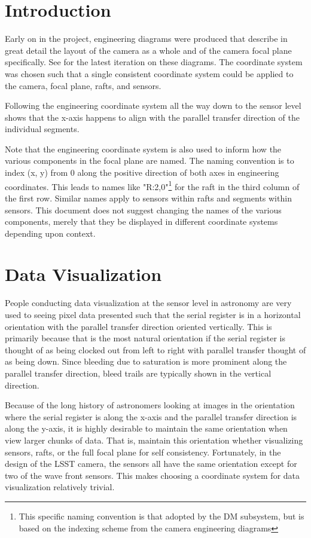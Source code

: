 \section{Introduction} \label{sec:intro}
Early on in the project, engineering diagrams were produced that describe in great detail the layout of the camera as a whole and of the camera focal plane specifically. See  for the latest iteration on these diagrams. The coordinate system was chosen such that a single consistent coordinate system could be applied to the camera, focal plane, rafts, and sensors.

Following the engineering coordinate system all the way down to the sensor level shows that the x-axis happens to align with the parallel transfer direction of the individual segments.

Note that the engineering coordinate system is also used to inform how the various components in the focal plane are named. The naming convention is to index (x, y) from 0 along the positive direction of both axes in engineering coordinates. This leads to names like "R:2,0"\footnote{This specific naming convention is that adopted by the DM subsystem, but is based on the indexing scheme from the camera engineering diagrams} for the raft in the third column of the first row. Similar names apply to sensors within rafts and segments within sensors. This document does not suggest changing the names of the various components, merely that they be displayed in different coordinate systems depending upon context.

\section{Data Visualization}
People conducting data visualization at the sensor level in astronomy are very used to seeing pixel data presented such that the serial register is in a horizontal orientation with the parallel transfer direction oriented vertically. This is primarily because that is the most natural orientation if the serial register is thought of as being clocked out from left to right with parallel transfer thought of as being down. Since bleeding due to saturation is more prominent along the parallel transfer direction, bleed trails are typically shown in the vertical direction.

Because of the long history of astronomers looking at images in the orientation where the serial register is along the x-axis and the parallel transfer direction is along the y-axis, it is highly desirable to maintain the same orientation when view larger chunks of data. That is, maintain this orientation whether visualizing sensors, rafts, or the full focal plane for self consistency. Fortunately, in the design of the LSST camera, the sensors all have the same orientation except for two of the wave front sensors. This makes choosing a coordinate system for data visualization relatively trivial.

